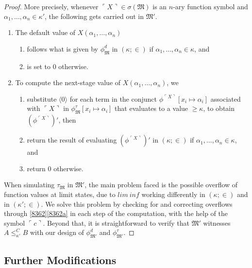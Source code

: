 \documentclass[12pt, twoside]{memoir}
\numberwithin{equation}{section}
\theoremstyle{definition}
\theoremstyle{remark}
\theoremstyle{definition}
\theoremstyle{definition}
\theoremstyle{definition}
\theoremstyle{remark}
\begin{document}
\begin{proof}
More precisely, whenever $\ulcorner X \urcorner \in \sigma(\mathfrak{M})$ is an $n$-ary function symbol and $\alpha_1, \dots, \alpha_n \in \kappa'$, the following gets carried out in $\mathfrak{M}'$.
\begin{enumerate}[label=(\arabic*)]
    \item The default value of $X(\alpha_1, \dots, \alpha_n)$
    \begin{enumerate}[label=(\alph*)]
        \item follows what is given by $\phi^d_{\mathfrak{M}}$ in $(\kappa; \in)$ if $\alpha_1, \dots, \alpha_n \in \kappa$, and
        \item is set to $0$ otherwise.
    \end{enumerate}
    \item\label{8362} To compute the next-stage value of $X(\alpha_1, \dots, \alpha_n)$, we
    \begin{enumerate}[label=(\alph*)]
        \item\label{8362a} substitute $\langle 0 \rangle$ for each term in the conjunct $\phi^{\ulcorner X \urcorner}[x_i \mapsto \alpha_i]$ associated with $\ulcorner X \urcorner$ in $\phi^{\tau}_{\mathfrak{M}}[x_i \mapsto \alpha_i]$ that evaluates to a value $\geq \kappa$, to obtain $(\phi^{\ulcorner X \urcorner})'$, then
        \item return the result of evaluating $(\phi^{\ulcorner X \urcorner})'$ in $(\kappa; \in)$ if $\alpha_1, \dots, \alpha_n \in \kappa$, and
        \item return $0$ otherwise.
    \end{enumerate}
\end{enumerate} 
When simulating $\tau_{\mathfrak{M}}$ in $\mathfrak{M}'$, the main problem faced is the possible overflow of function values at limit states, due to $lim \ inf$ working differently in $(\kappa; \in)$ and in $(\kappa'; \in)$. We solve this problem by checking for and correcting overflows through \ref{8362}\ref{8362a} in each step of the computation, with the help of the symbol $\ulcorner c \urcorner$. Beyond that, it is straightforward to verify that $\mathfrak{M}'$ witnesses $A \leq^C_{\kappa'} B$ with our design of $\phi^d_{\mathfrak{M}'}$ and $\phi^{\tau}_{\mathfrak{M}'}$.
\end{proof}

\subsection{Further Modifications}\label{ss320}
\end{document}
